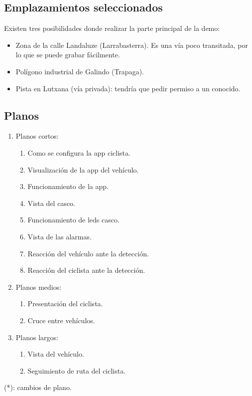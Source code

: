 \subsection{Emplazamientos seleccionados}
Existen tres posibilidades donde realizar la parte principal de la demo:
\begin{itemize}
	\item Zona de la calle Landaluze (Larrabasterra). Es una vía poco transitada, por lo que se puede grabar fácilmente.
	
	\item Polígono industrial de Galindo (Trapaga).
	
	\item Pista en Lutxana (vía privada): tendría que pedir permiso a un conocido.
\end{itemize}

\subsection{Planos}
\begin{enumerate}
	\item Planos cortos:
	\begin{enumerate}
		\item Como se configura la app ciclista.
		\item Visualización de la app del vehículo.
		\item Funcionamiento de la app.
		\item Vista del casco.
		\item Funcionamiento de leds casco.
		\item Vista de las alarmas.
		\item Reacción del vehículo ante la detección.
		\item Reacción del ciclista ante la detección.
	\end{enumerate}
	
	\item Planos medios:
	\begin{enumerate}
		\item Presentación del ciclista.
		\item Cruce entre vehículos.
	\end{enumerate}
	
	\item Planos largos:
	\begin{enumerate}
		\item Vista del vehículo.
		\item Seguimiento de ruta del ciclista.
	\end{enumerate}
\end{enumerate}
(*): cambios de plano.

